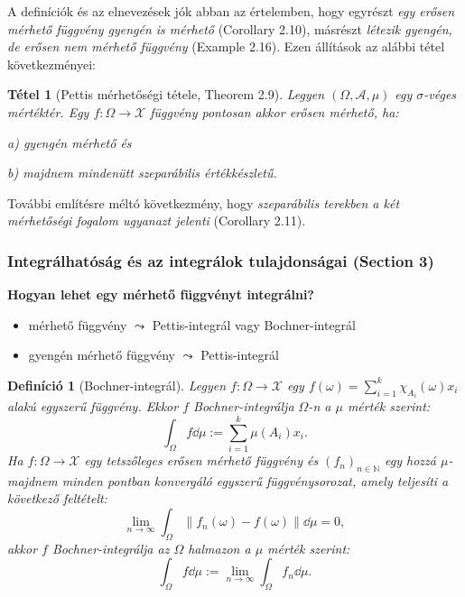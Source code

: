 \documentclass{beamer} %
\newtheorem{theo}[lem]{Tétel}
\newtheorem{defi}[lem]{Definíció}
\begin{document}
\begin{frame}
\justifying
A definíciók és az elnevezések jók abban az értelemben, hogy egyrészt \textit{egy erősen mérhető függvény gyengén is mérhető} (Corollary 2.10), \pause másrészt \textit{létezik gyengén, de erősen nem mérhető függvény} (Example 2.16). Ezen állítások az alábbi tétel következményei:
\pause \begin{theo}[Pettis mérhetőségi tétele, Theorem 2.9] Legyen $(\Omega,\mathcal{A},\mu)$ egy $\sigma$-véges mértéktér. Egy $f \colon \Omega \to \mathcal{X}$ függvény pontosan akkor erősen mérhető, ha:

a) gyengén mérhető és

b) majdnem mindenütt szeparábilis értékkészletű.
\end{theo}
\pause További említésre méltó következmény, hogy \textit{szeparábilis terekben a két mérhetőségi fogalom ugyanazt jelenti} (Corollary 2.11).
\end{frame}

\begin{frame}
\frametitle{Integrálhatóság és az integrálok tulajdonságai (Section 3)}
\textbf{Hogyan lehet egy mérhető függvényt integrálni?}
\begin{itemize}
\pause \item mérhető függvény $\leadsto$ Pettis-integrál vagy Bochner-integrál
\pause \item gyengén mérhető függvény $\leadsto$ Pettis-integrál
\end{itemize}
\end{frame}

\begin{frame}
\justifying
\begin{defi}[Bochner-integrál] Legyen $f \colon \Omega \to \mathcal{X}$ egy $f(\omega) = \sum^{k}_{i=1} \chi_{A_i}(\omega) x_i$ alakú egyszerű függvény. Ekkor $f$ Bochner-integrálja $\Omega$-n a $\mu$ mérték szerint:
$$\int_{\Omega} f \dd{\mu} := \sum^{k}_{i=1} \mu(A_i) x_i.$$
Ha $f \colon \Omega \to \mathcal{X}$ egy tetszőleges erősen mérhető függvény és $(f_n)_{n \in \mathbb{N}}$ egy hozzá $\mu$-majdnem minden pontban konvergáló egyszerű függvénysorozat, amely teljesíti a következő feltételt:
$$\lim_{n \to \infty}\int_{\Omega} \| f_n(\omega) - f(\omega) \| \dd{\mu} = 0,$$
akkor $f$ Bochner-integrálja az $\Omega$ halmazon a $\mu$ mérték szerint:
$$\int_{\Omega} f \dd{\mu} := \lim_{n \to \infty} \int_{\Omega} f_n \dd{\mu}.$$
\end{defi}
\end{frame}
\end{document}
